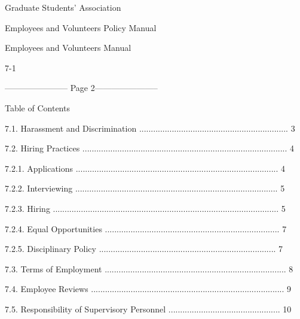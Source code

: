                                        Graduate Students’ Association  

                                   Employees and Volunteers Policy Manual  

                                    Employees and Volunteers Manual  

                                   

                                                                7-1  


----------------------- Page 2-----------------------

                                                Table of Contents  



  

7.1.      Harassment and Discrimination ................................................................ 3  

7.2.      Hiring Practices ........................................................................................ 4  

   7.2.1.        Applications ....................................................................................... 4  

   7.2.2.        Interviewing ....................................................................................... 5  

   7.2.3.        Hiring ................................................................................................. 5  

   7.2.4.        Equal Opportunities ........................................................................... 7  

   7.2.5.        Disciplinary Policy ............................................................................ 7  

7.3.      Terms of Employment .............................................................................. 8  

7.4.      Employee Reviews ................................................................................... 9  

7.5.      Responsibility of Supervisory Personnel ................................................ 10  



                                                                 



                                                                 



